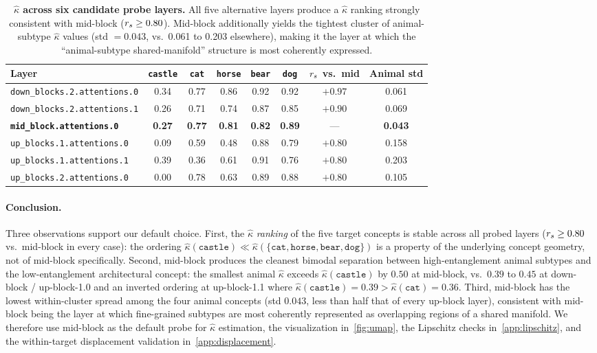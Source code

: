 \begin{table}[ht]
\centering
\small
\setlength{\tabcolsep}{2pt}
\begin{tabular}{lccccc|cc}
\toprule
\textbf{Layer} & \texttt{castle} & \texttt{cat} & \texttt{horse} & \texttt{bear} & \texttt{dog} & $r_s$ vs.\ mid & Animal std \\
\midrule
\texttt{down\_blocks.2.attentions.0} & 0.34 & 0.77 & 0.86 & 0.92 & 0.92 & $+0.97$ & 0.061 \\
\texttt{down\_blocks.2.attentions.1} & 0.26 & 0.71 & 0.74 & 0.87 & 0.85 & $+0.90$ & 0.069 \\
\textbf{\texttt{mid\_block.attentions.0}} & \textbf{0.27} & \textbf{0.77} & \textbf{0.81} & \textbf{0.82} & \textbf{0.89} & --- & \textbf{0.043} \\
\texttt{up\_blocks.1.attentions.0} & 0.09 & 0.59 & 0.48 & 0.88 & 0.79 & $+0.80$ & 0.158 \\
\texttt{up\_blocks.1.attentions.1} & 0.39 & 0.36 & 0.61 & 0.91 & 0.76 & $+0.80$ & 0.203 \\
\texttt{up\_blocks.2.attentions.0} & 0.00 & 0.78 & 0.63 & 0.89 & 0.88 & $+0.80$ & 0.105 \\
\bottomrule
\end{tabular}
\caption{\textbf{$\hat\kappa$ across six candidate probe layers.} All five alternative layers produce a $\hat\kappa$ ranking strongly consistent with mid-block ($r_s \geq 0.80$). Mid-block additionally yields the tightest cluster of animal-subtype $\hat\kappa$ values (std $=0.043$, vs.\ 0.061 to 0.203 elsewhere), making it the layer at which the ``animal-subtype shared-manifold'' structure is most coherently expressed.}
\label{tab:layer_sensitivity}
\end{table}

\paragraph{Conclusion.} Three observations support our default choice. First, the $\hat\kappa$ \emph{ranking} of the five target concepts is stable across all probed layers ($r_s \geq 0.80$ vs.\ mid-block in every case): the ordering $\hat\kappa(\texttt{castle}) \ll \hat\kappa(\{\texttt{cat}, \texttt{horse}, \texttt{bear}, \texttt{dog}\})$ is a property of the underlying concept geometry, not of mid-block specifically. Second, mid-block produces the cleanest bimodal separation between high-entanglement animal subtypes and the low-entanglement architectural concept: the smallest animal $\hat\kappa$ exceeds $\hat\kappa(\texttt{castle})$ by $0.50$ at mid-block, vs.\ $0.39$ to $0.45$ at down-block / up-block-1.0 and an inverted ordering at up-block-1.1 where $\hat\kappa(\texttt{castle}) = 0.39 > \hat\kappa(\texttt{cat}) = 0.36$. Third, mid-block has the lowest within-cluster spread among the four animal concepts (std $0.043$, less than half that of every up-block layer), consistent with mid-block being the layer at which fine-grained subtypes are most coherently represented as overlapping regions of a shared manifold. We therefore use mid-block as the default probe for $\hat\kappa$ estimation, the visualization in~\cref{fig:umap}, the Lipschitz checks in~\cref{app:lipschitz}, and the within-target displacement validation in~\cref{app:displacement}.

